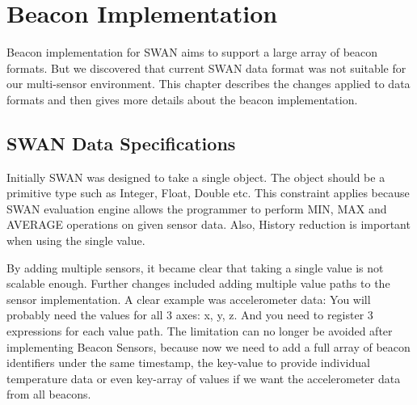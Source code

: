 
\chapter{Beacon Implementation}%

\label{Chapter4} %

Beacon implementation for SWAN aims to support a large array of beacon formats. But we discovered that current SWAN data format was not suitable 
for our multi-sensor environment. This chapter describes the changes applied to data formats and then gives more details about the beacon implementation.


\section{SWAN Data Specifications}\label{ssec:swandataspecifications} 

Initially SWAN was designed to take a single object.
The object should be a primitive type such as Integer, Float, Double etc.
This constraint applies because SWAN evaluation engine allows the programmer to perform MIN, MAX and AVERAGE operations on given sensor data.
Also, History reduction is important when using the single value.

By adding multiple sensors, it became clear that taking a single value is not scalable enough. 
Further changes included adding multiple value paths to the sensor implementation. 
A clear example was accelerometer data: You will probably need the values for all 3 axes: x, y, z.
And you need to register 3 expressions for each value path.
The limitation can no longer be avoided after implementing Beacon Sensors, because now we need to add a full array of beacon identifiers under the same timestamp,
the key-value to provide individual temperature data or even key-array of values if we want the accelerometer data from all beacons.

